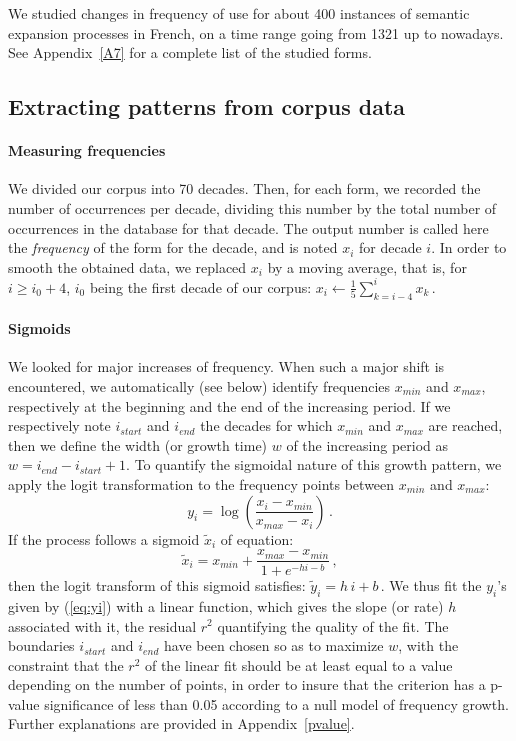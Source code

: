 \documentclass[12pt,twocolumn,amsmath,amssymb,aps,longbibliography]{revtex4-1}  %
\newcommand{\tit}{\textit}
\newcommand{\beq}{\begin{equation}}
\newcommand{\eneq}{\end{equation}}
\begin{document}
We studied changes in frequency of use for about 400 instances of semantic expansion processes in French, on a time range going from 1321 up to nowadays. See Appendix~\ref{A7} for a complete list of the studied forms. 

\subsection*{Extracting patterns from corpus data} 

\paragraph{Measuring frequencies} 
We divided our corpus into 70 decades. Then, for each form, we recorded the number of occurrences per decade, dividing this number by the total number of occurrences in the database for that decade. The output number is called here the \tit{frequency} of the form for the decade, and is noted $x_i$ for decade $i$. In order to smooth the obtained data, we replaced $x_i$ by a moving average, that is, for $i \geq i_0 + 4$, $i_0$ being the first decade of our corpus:
$x_i \leftarrow \frac{1}{5} \sum_{k=i-4}^i x_k\,.$ 
 
\paragraph{Sigmoids}
We looked for major increases of frequency. When such a major shift is encountered, we automatically (see below) identify frequencies $x_{min}$ and $x_{max}$, respectively at the beginning and the end of the increasing period. If we respectively note $i_{start}$ and $i_{end}$ the decades for which $x_{min}$ and $x_{max}$ are reached, then we define the width (or growth time) $w$ of the increasing period as $w = i_{end}-i_{start} +1$. To quantify the sigmoidal nature of this growth pattern, we apply the logit transformation to the frequency points between $x_{min}$ and $x_{max}$:
{\small\beq
y_i =  \log \left( \frac{x_i-x_{min}}{x_{max}-x_i} \right) \,.
\label{eq:yi}
\eneq}
If the process follows a sigmoid $\tilde{x}_i$ of equation:
{\small\beq
\tilde{x}_i = x_{min}+\frac{x_{max}-x_{min}}{1+e^{-hi-b}}\,,
\eneq}
then the logit transform of this sigmoid satisfies:
$\tilde{y}_i =h\, i + b\,.$
We thus fit the $y_i$'s given by (\ref{eq:yi}) with a linear function, which gives the slope (or rate) $h$ associated with it, the residual $r^2$ quantifying the quality of the fit. The boundaries $i_{start}$ and $i_{end}$ have been chosen so as to maximize $w$, with the constraint that the $r^2$ of the linear fit should be at least equal to a value depending on the number of points, in order to insure that the criterion has a p-value significance of less than 0.05 according to a null model of frequency growth. Further explanations are provided in Appendix~\ref{pvalue}. 
\end{document}
